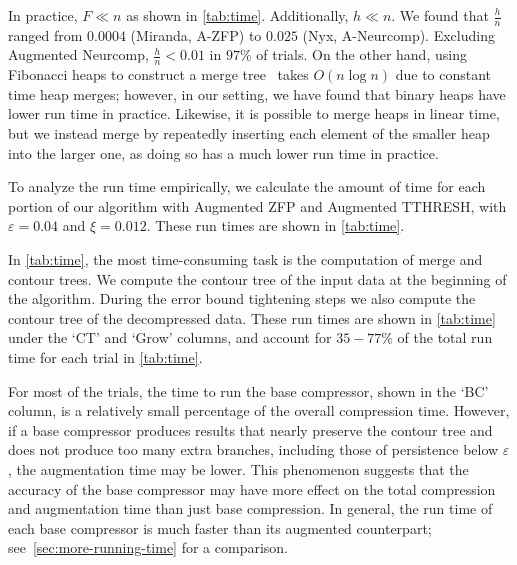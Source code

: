 In practice, $F \ll n$ as shown in \cref{tab:time}. 
Additionally, $h \ll n$. We found that $\frac{h}{n}$ ranged from $0.0004$ (Miranda, A-ZFP) to $0.025$ (Nyx, A-Neurcomp). Excluding Augmented Neurcomp, $\frac{h}{n} < 0.01$ in $97\%$ of trials.  
On the other hand, using Fibonacci heaps to construct a merge tree~\cite{gueunet2017task} takes $O(n \log n)$ due to constant time heap merges; however, in our setting, we have found that binary heaps have lower run time in practice. Likewise, it is possible to merge heaps in linear time, but we instead merge by repeatedly inserting each element of the smaller heap into the larger one, as doing so has a much lower run time in practice.

 To analyze the run time empirically, we calculate the amount of time for each portion of our algorithm with Augmented ZFP and Augmented TTHRESH,  with $\varepsilon = 0.04$ and $\xi = 0.012$. These run times are shown in \cref{tab:time}.

In \cref{tab:time}, the most time-consuming task is the computation of merge and contour trees. We compute the contour tree of the input data at the beginning of the algorithm. During the error bound tightening steps we also compute the contour tree of the decompressed data. These run times are shown in \cref{tab:time} under the `CT' and `Grow' columns, and account for $35-77\%$ of the total run time for each trial in \cref{tab:time}. 

For most of the trials, the time to run the base compressor, shown in the `BC' column, is a relatively small percentage of the overall compression time. 
However, if a base compressor produces results that nearly preserve the contour tree and does not produce too many extra branches, including those of persistence below $\varepsilon$, the augmentation time may be lower. This phenomenon suggests that the accuracy of the base compressor may have more effect on the total compression and augmentation time than just base compression.
In general, the run time of each base compressor is much faster than its augmented counterpart; see~\cref{sec:more-running-time} for a comparison. 

